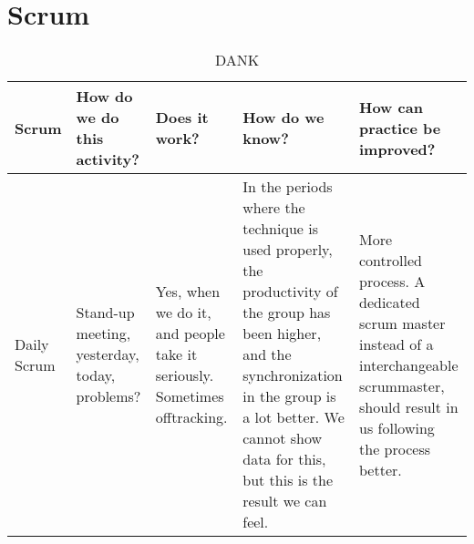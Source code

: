 \section{Scrum}
\begin{table}[]
\centering
\caption{DANK}
\label{my-label}
\begin{tabular}{|l|l|l|l|l|}
\hline
\multicolumn{1}{|r|}{Scrum} & How do we do this activity?                                                                                                                                                                             & Does it work?                                                                                                                                                                                                                                                                              & How do we know?                                                                                                                                                                                                                                                                                                                                                                                                                                         & How can practice be improved?                                                                                                                                                                                                                                                                \\ \hline
Daily Scrum                 & Stand-up meeting, yesterday, today, problems?                                                                                                                                                           & Yes, when we do it, and people take it seriously. Sometimes offtracking.                                                                                                                                                                                                                   & In the periods where the technique is used properly, the productivity of the group has been higher, and the synchronization in the group is a lot better. We cannot show data for this, but this is the result we can feel.                                                                                                                                                                                                                             & More controlled process. A dedicated scrum master instead of a interchangeable scrummaster, should result in us following the process better.                                                                                                                                                \\ \hline

\end{tabular}
\end{table}
